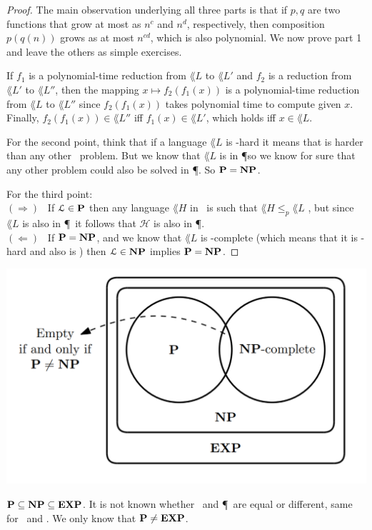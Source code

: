 \begin{proof}
	The main observation underlying all three parts is that if $p,q$ are two functions that grow at most as $n^c$ and $n^d$, respectively, then composition $p(q(n))$ grows as at most $n^{cd}$, which is also polynomial. We now prove part 1 and leave the others as simple exercises.

	If $f_1$ is a polynomial-time reduction from $\lang{L}$ to $\lang{L}'$ and $f_2$ is a reduction from $\lang{L}'$ to $\lang{L}''$, then the mapping $x \mapsto f_2(f_1(x))$ is a polynomial-time reduction from $\lang{L}$ to $\lang{L}''$ since $f_2(f_1(x))$ takes polynomial time to compute given $x$. Finally, $f_2(f_1(x)) \in \lang{L}''$ iff $f_1(x) \in \lang{L}'$, which holds iff $x \in \lang{L}$.

	For the second point, think that if a language \(\lang{L}\) is \NP-hard it means that is harder than any other \NP~problem. But we know that \(\lang{L}\) is in \P so we know for sure that any other problem could also be solved in \P. So $\textbf{P} = \textbf{NP}$.

	For the third point:\\
	$(\Rightarrow)$ \ If \(\mathcal{L} \in \textbf{P}\) then any language $\lang{H}$ in \NP~is such that \(\lang{H} \leq_p \lang{L}\) , but since \(\lang{L}\)  is also in \P~it follows that \(\mathcal{H}\) is also in \P. \\
	$(\Leftarrow)$ \ If $\textbf{P} = \textbf{NP}$, and we know that \(\lang{L}\) is \NP-complete (which means that it is \NP-hard and also is \NP) then \(	\mathcal{L} \in \textbf{NP}\) implies  \( \textbf{P} = \textbf{NP}\).

\end{proof}

\begin{marginfigure}[-10cm]
	\centering
	\includegraphics[width = \textwidth]{figures/P-NP-diagram.png}
	\caption{\( \textbf{P} \subseteq \textbf{NP} \subseteq \textbf{EXP}\).
		It is not known whether \NP~and \P~are equal or different, same for \NP~and \EXP. We only know that $\textbf{P} \neq \textbf{EXP}$.}
	\label{fig:P-NP-diagram}
\end{marginfigure}


